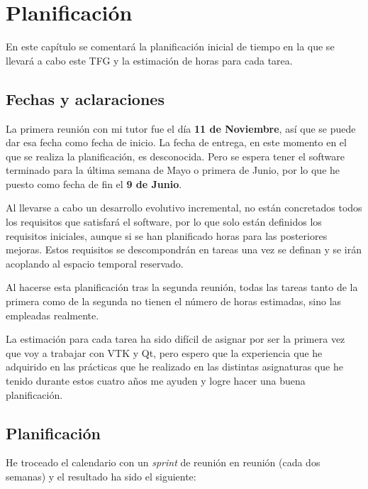 \chapter{Planificación}

En este capítulo se comentará la planificación inicial de tiempo en la que se llevará a cabo este TFG y la estimación de horas para cada tarea.

\section{Fechas y aclaraciones}

La primera reunión con mi tutor fue el día \textbf{11 de Noviembre}, así que se puede dar esa fecha como fecha de inicio. La fecha de entrega, en este momento en el que se realiza la planificación, es desconocida. Pero se espera tener el software terminado para la última semana de Mayo o primera de Junio, por lo que he puesto como fecha de fin el \textbf{9 de Junio}.

Al llevarse a cabo un desarrollo evolutivo incremental, no están concretados todos los requisitos que satisfará el software, por lo que solo están definidos los requisitos iniciales, aunque si se han planificado horas para las posteriores mejoras. Estos requisitos se descompondrán en tareas una vez se definan y se irán acoplando al espacio temporal reservado.

Al hacerse esta planificación tras la segunda reunión, todas las tareas tanto de la primera como de la segunda no tienen el número de horas estimadas, sino las empleadas realmente.

La estimación para cada tarea ha sido difícil de asignar por ser la primera vez que voy a trabajar con VTK y Qt, pero espero que la experiencia que he adquirido en las prácticas que he realizado en las distintas asignaturas que he tenido durante estos cuatro años me ayuden y logre hacer una buena planificación.

\section{Planificación}

He troceado el calendario con un \textit{sprint} de reunión en reunión (cada dos semanas) y el resultado ha sido el siguiente:

